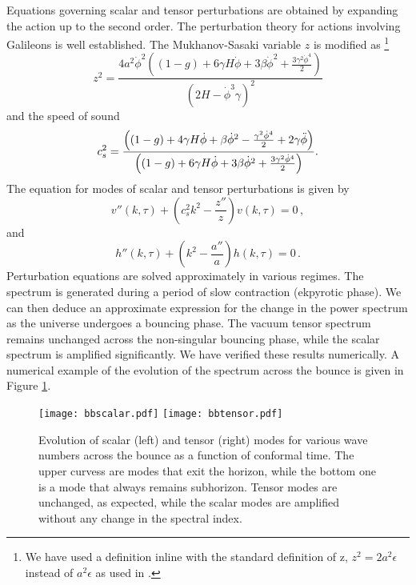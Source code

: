 \documentclass[12pt,a4paper]{article}
\numberwithin{equation}{section}
\numberwithin{equation}{section}
\begin{document}
Equations governing scalar and tensor perturbations are obtained by expanding the action up to the second order. The perturbation theory for actions involving Galileons is well established. The Mukhanov-Sasaki variable $z$  is modified as \cite{Cai:2012va}\footnote{We have used a definition inline with the standard definition of z, $z^2=2a^2 \epsilon$ instead of $a^2 \epsilon$ as used in \cite{Cai:2012va}.}
\begin{equation}
z^2 = \frac{4a^2\dot{\phi}^2 \left((1-g)+6\gamma H \dot{\phi}+3\beta \dot{\phi}^2+\frac{3\gamma^2\dot{\phi}^4}{2}\right)}{(2H-\dot{\phi}^3 \gamma)^2}
\label{eq:bz}
\end{equation}
and the speed of sound \cite{Cai:2012va}
\begin{equation}
   c_s^2 =  \frac{ \left((1-g)+4\gamma H \dot{\phi}+\beta \dot{\phi}^2-\frac{\gamma^2\dot{\phi}^4}{2}+2\gamma \Ddot{\phi}\right)}{\left((1-g)+6\gamma H \dot{\phi}+3\beta \dot{\phi}^2+\frac{3\gamma^2\dot{\phi}^4}{2}\right)}.
   \label{eq:bcs}
\end{equation}
The equation for modes of scalar and tensor perturbations is given by
\begin{equation}
    v''(k,\tau)+\left(c_s^2 k^2-\frac{z''}{z} \right) v(k,\tau) = 0 \, ,
    \label{eq:muksass}
\end{equation}
and
\begin{equation}
    h''(k,\tau)+\left( k^2-\frac{a''}{a} \right) h(k,\tau) = 0 \, .
    \label{eq:muksast}
\end{equation}
Perturbation equations are solved approximately in various regimes. The spectrum is generated during a period of slow contraction (ekpyrotic phase). We can then deduce an approximate expression for the change in the power spectrum as the universe undergoes a bouncing phase. The vacuum tensor spectrum remains unchanged across the non-singular bouncing phase, while the scalar spectrum is amplified significantly. We have verified these results numerically. A numerical example of the evolution of the spectrum across the bounce is given in Figure \ref{fig:vacc spectrum}. 
\begin{figure}[H]
    \centering
    \texttt{[image: bbscalar.pdf]} 
    \hfill
     \texttt{[image: bbtensor.pdf]} 
     \caption{Evolution of scalar (left) and tensor (right) modes for various wave numbers across the bounce as a function of conformal time. The upper curvess are modes that exit the horizon, while the bottom one is a mode that always remains subhorizon. Tensor modes are unchanged, as expected, while the scalar modes are amplified without any change in the spectral index.}
\label{fig:vacc spectrum}
\end{figure}
\end{document}
